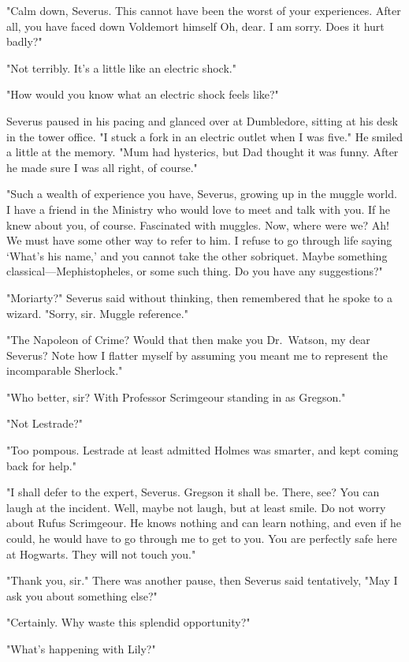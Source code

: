 "Calm down, Severus. This cannot have been the worst of your experiences. After all, you have faced down Voldemort himself{\el} Oh, dear. I am sorry. Does it hurt badly?"

"Not terribly. It's a little like an electric shock."

"How would you know what an electric shock feels like?"

Severus paused in his pacing and glanced over at Dumbledore, sitting at his desk in the tower office. "I stuck a fork in an electric outlet when I was five." He smiled a little at the memory. "Mum had hysterics, but Dad thought it was funny. After he made sure I was all right, of course."

"Such a wealth of experience you have, Severus, growing up in the muggle world. I have a friend in the Ministry who would love to meet and talk with you. If he knew about you, of course. Fascinated with muggles. Now, where were we? Ah! We must have some other way to refer to{\el} him. I refuse to go through life saying `What's his name,' and you cannot take the other sobriquet. Maybe something classical—Mephistopheles, or some such thing. Do you have any suggestions?"

"Moriarty?" Severus said without thinking, then remembered that he spoke to a wizard. "Sorry, sir. Muggle reference."

"The Napoleon of Crime? Would that then make you Dr.~Watson, my dear Severus? Note how I flatter myself by assuming you meant me to represent the incomparable Sherlock."

"Who better, sir? With Professor Scrimgeour standing in as Gregson."

"Not Lestrade?"

"Too pompous. Lestrade at least admitted Holmes was smarter, and kept coming back for help."

"I shall defer to the expert, Severus. Gregson it shall be. There, see? You can laugh at the incident. Well, maybe not laugh, but at least smile. Do not worry about Rufus Scrimgeour. He knows nothing and can learn nothing, and even if he could, he would have to go through me to get to you. You are perfectly safe here at Hogwarts. They will not touch you."

"Thank you, sir." There was another pause, then Severus said tentatively, "May I ask you about something else?"

"Certainly. Why waste this splendid opportunity?"

"What's happening with Lily?"

